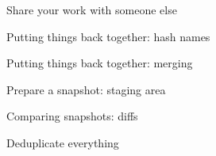 \documentclass[english]{slides}
\begin{document}
\begin{frame}{Share your work with someone else}
\end{frame}

\begin{frame}{Putting things back together: hash names}
\end{frame}

\begin{frame}{Putting things back together: merging}
\end{frame}

\begin{frame}{Prepare a snapshot: staging area}
\end{frame}

\begin{frame}{Comparing snapshots: diffs}
\end{frame}

\begin{frame}{Deduplicate everything}


\end{frame}
\end{document}
